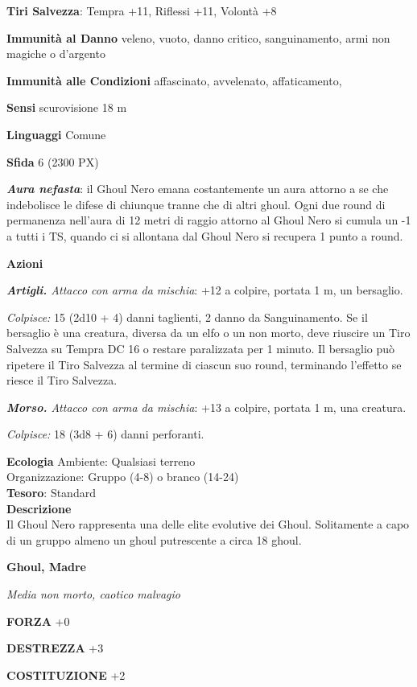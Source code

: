 \begin{multicols}{2}
\textbf{Tiri Salvezza}: Tempra +11, Riflessi +11, Volontà +8

\textbf{Immunità al Danno} veleno, vuoto, danno critico, sanguinamento, armi non magiche o d'argento

\textbf{Immunità alle Condizioni} affascinato, avvelenato, affaticamento,

\textbf{Sensi} scurovisione 18 m

\textbf{Linguaggi} Comune

\textbf{Sfida} 6 (2300 PX)

\textbf{\textit{Aura nefasta}}: il Ghoul Nero emana costantemente un aura attorno a se che indebolisce le difese di chiunque tranne che di altri ghoul. Ogni due round di permanenza nell'aura di 12 metri di raggio attorno al Ghoul Nero si cumula un -1 a tutti i TS, quando ci si allontana dal Ghoul Nero si recupera 1 punto a round.

\textbf{Azioni}

\textit{\textbf{Artigli.} Attacco con arma da mischia}: +12 a colpire, portata 1 m, un bersaglio.

\textit{Colpisce:} 15 (2d10 + 4) danni taglienti, 2 danno da Sanguinamento. Se il bersaglio è una creatura, diversa da un elfo o un non morto, deve riuscire un Tiro Salvezza su Tempra DC 16 o restare paralizzata per 1 minuto. Il bersaglio può ripetere il Tiro Salvezza al termine di ciascun suo round, terminando l'effetto se riesce il Tiro Salvezza.

\textit{\textbf{Morso.} Attacco con arma da mischia}: +13 a colpire, portata 1 m, una creatura.

\textit{Colpisce:} 18 (3d8 + 6) danni perforanti.

\textbf{Ecologia}
Ambiente: Qualsiasi terreno\\
Organizzazione: Gruppo (4-8) o branco (14-24)\\
\textbf{Tesoro}: Standard\\
\textbf{Descrizione}\\
Il Ghoul Nero rappresenta una delle elite evolutive dei Ghoul. Solitamente a capo di un gruppo almeno un ghoul putrescente a circa 18 ghoul.

\medskip{}\textbf{Ghoul, Madre}

\textit{Media non morto, caotico malvagio}

\textbf{FORZA} +0

\textbf{DESTREZZA} +3

\textbf{COSTITUZIONE} +2


\end{multicols}
